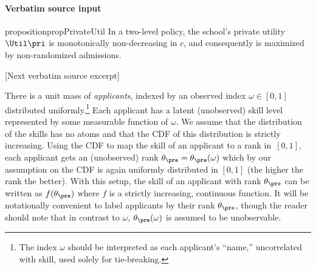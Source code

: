 \documentclass[10pt]{article}
\begin{document}
\paragraph{Verbatim source input}
\begin{ReviewVerbatim}
\begin{restatable}{proposition}{propPrivateUtil}%
\label{prop:private-util-max}
In a two-level policy, the school's private utility~$\Util\pri$ is monotonically non-decreasing in $c$, and consequently is maximized by non-randomized admissions.
\end{restatable}

[Next verbatim source excerpt]

There is a unit mass of \textit{applicants}, indexed by an observed index $\omega \in [0,1]$ distributed uniformly.\footnote{The index $\omega$ should be interpreted as each applicant's ``name,'' uncorrelated with skill, used solely for tie-breaking.}  Each applicant has a latent (unobserved) skill level represented by some measurable function of $\omega$.
We assume that {the distribution of the skills} has no atoms and that the CDF of this distribution is strictly increasing.
Using the CDF to map the skill of an applicant to a rank in~$[0,1]$, each applicant gets an (unobserved) rank $\theta_\pre =\theta_\pre(\omega)$ which by our assumption on the CDF is again uniformly distributed in $[0, 1]$ (the higher the rank the better).  With this setup, the skill of an applicant with rank $\theta_\pre$ can be written as $f(\theta_\pre)$ where $f$ is a strictly increasing, continuous function.  {It will be notationally convenient to label applicants by their rank $\theta_\pre$, though the reader should note that in contrast to $\omega$, $\theta_\pre(\omega)$ is assumed to be unobservable.}




\end{ReviewVerbatim}
\end{document}
